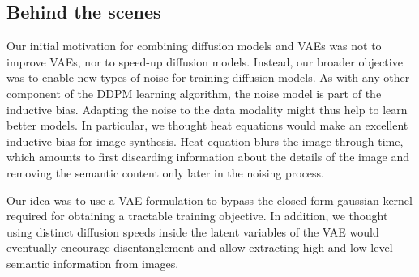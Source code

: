 %


\subsection{Behind the scenes}
Our initial motivation for combining diffusion models and VAEs was not to improve VAEs, nor to speed-up diffusion models. Instead, our broader objective was to enable new types of noise for training diffusion models. As with any other component of the DDPM learning algorithm, the noise model is part of the inductive bias. Adapting the noise to the data modality might thus help to learn better models. In particular, we thought heat equations would make an excellent inductive bias for image synthesis. Heat equation blurs the image through time, which amounts to first discarding information about the details of the image and removing the semantic content only later in the noising process.

Our idea was to use a VAE formulation to bypass the closed-form gaussian kernel required for obtaining a tractable training objective. In addition, we thought using distinct diffusion speeds inside the latent variables of the VAE would eventually encourage disentanglement and allow extracting high and low-level semantic information from images.

